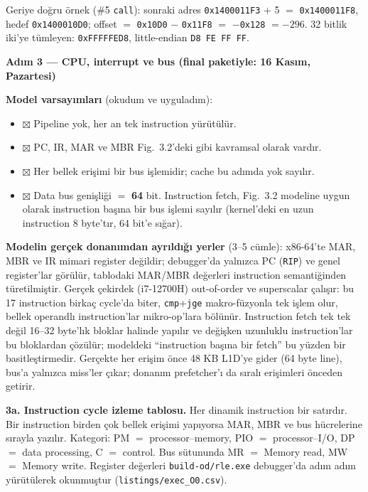 \documentclass[11pt,a4paper]{article}
\newcommand{\tl}{\texttt}
\begin{document}
Geriye doğru örnek (\#5 \tl{call}): sonraki adres \tl{0x1400011F3} $+$ 5 $=$
\tl{0x1400011F8}, hedef \tl{0x1400010D0}; offset $=$ \tl{0x10D0} $-$ \tl{0x11F8} $=$
$-$\tl{0x128} $= -296$. 32 bitlik iki'ye tümleyen: \tl{0xFFFFFED8}, little-endian
\tl{D8 FE FF FF}.

\textbf{Adım 3 --- CPU, interrupt ve bus (final paketiyle: 16 Kasım, Pazartesi)}

\textbf{Model varsayımları} (okudum ve uyguladım):

\begin{itemize}[leftmargin=2em,itemsep=1pt,topsep=2pt]
\item $\boxtimes$ Pipeline yok, her an tek instruction yürütülür.
\item $\boxtimes$ PC, IR, MAR ve MBR Fig.~3.2'deki gibi kavramsal olarak vardır.
\item $\boxtimes$ Her bellek erişimi bir bus işlemidir; cache bu adımda yok sayılır.
\item $\boxtimes$ Data bus genişliği $=$ \textbf{64} bit. Instruction fetch, Fig.~3.2 modeline uygun olarak instruction başına bir bus işlemi sayılır (kernel'deki en uzun instruction 8 byte'tır, 64 bit'e sığar).
\end{itemize}

\textbf{Modelin gerçek donanımdan ayrıldığı yerler} (3--5 cümle): x86-64'te MAR, MBR ve IR mimari register değildir; debugger'da yalnızca PC (\tl{RIP}) ve genel register'lar görülür, tablodaki MAR/MBR değerleri instruction semantiğinden türetilmiştir. Gerçek çekirdek (i7-12700H) out-of-order ve superscalar çalışır: bu 17 instruction birkaç cycle'da biter, \tl{cmp}+\tl{jge} makro-füzyonla tek işlem olur, bellek operandlı instruction'lar mikro-op'lara bölünür. Instruction fetch tek tek değil 16--32 byte'lık bloklar halinde yapılır ve değişken uzunluklu instruction'lar bu bloklardan çözülür; modeldeki ``instruction başına bir fetch'' bu yüzden bir basitleştirmedir. Gerçekte her erişim önce 48 KB L1D'ye gider (64 byte line), bus'a yalnızca miss'ler çıkar; donanım prefetcher'ı da sıralı erişimleri önceden getirir.

\textbf{3a. Instruction cycle izleme tablosu.} Her dinamik instruction bir satırdır. Bir instruction
birden çok bellek erişimi yapıyorsa MAR, MBR ve bus hücrelerine sırayla yazılır. Kategori:
PM $=$ processor--memory, PIO $=$ processor--I/O, DP $=$ data processing, C $=$ control. Bus
sütununda MR $=$ Memory read, MW $=$ Memory write. Register değerleri \tl{build-od/rle.exe}
debugger'da adım adım yürütülerek okunmuştur (\tl{listings/exec\_O0.csv}).
\end{document}
